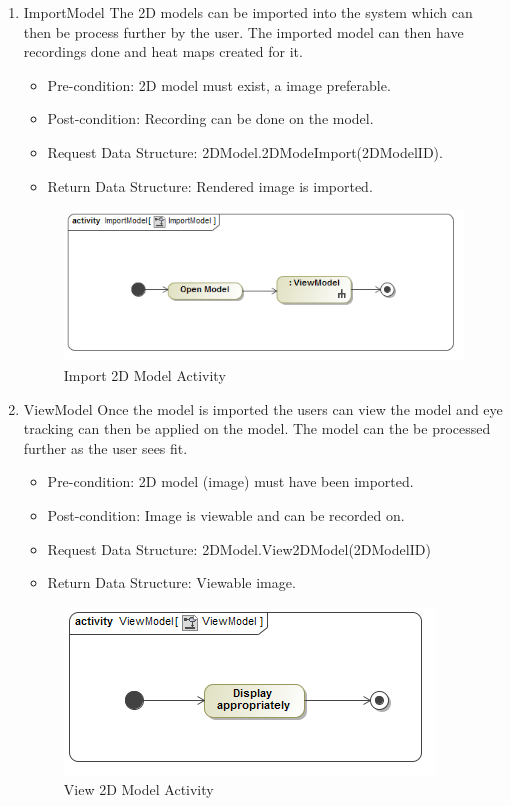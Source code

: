 	\begin{enumerate}
		\item{ImportModel}
		\newline
		The 2D models can be imported into the system which can then be process further by the user. The imported model can then have recordings done and heat maps created for it. 
		\begin{itemize}
			\item Pre-condition: 2D model must exist, a image preferable.
			\item Post-condition: Recording can be done on the model.
			\item Request Data Structure: 2DModel.2DModeImport(2DModelID).
			\item Return Data Structure: Rendered image is imported.
		\end{itemize}
		
		\begin{figure}[!ht]
			\centering
			\includegraphics[scale=0.5]{Diagrams/Activity_Diagram__ImportModel__ImportModel.png}
			\caption{Import 2D Model Activity}
		\end{figure}
	
		\item{ViewModel}
		Once the model is imported the users can view the model and eye tracking can then be applied on the model. The model can the be processed further as the user sees fit.
		\begin{itemize}
			\item Pre-condition: 2D model (image) must have been imported.
			\item Post-condition: Image is viewable and can be recorded on.
			\item Request Data Structure: 2DModel.View2DModel(2DModelID)
			\item Return Data Structure: Viewable image.
		\end{itemize}
		
		\begin{figure}[!ht]
			\centering
			\includegraphics[scale=0.5]{Diagrams/Activity_Diagram__ViewModel__ViewModel.png}
			\caption{View 2D Model Activity}
		\end{figure}
	

\end{enumerate}
